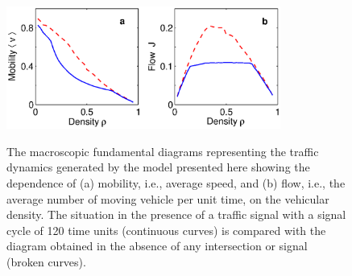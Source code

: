 \documentclass[conference]{IEEEtran}
\begin{document}
\begin{figure}
{    \includegraphics[width=9.0cm, angle=0]{figures/fig5.eps}}
\caption{The macroscopic fundamental diagrams representing the
traffic dynamics generated by the model presented here showing the
dependence of (a) mobility, i.e., average speed, and (b) flow, i.e.,
the average number of moving vehicle per unit time, on the vehicular density. 
The situation in the presence of a traffic signal with a signal cycle
of 120 time units (continuous curves) is compared with the diagram
obtained in the absence of any intersection or signal (broken
curves).}
    \label{fund}
\end{figure}
\end{document}

